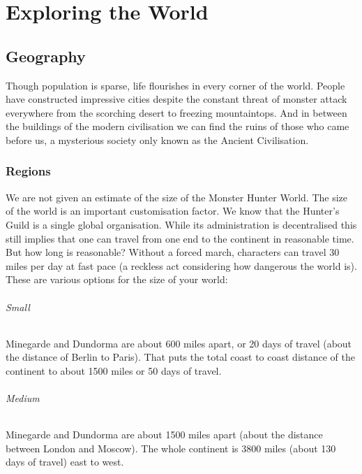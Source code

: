 
\renewcommand*{\hbPartCover}{assets/ext/world-cover}
\renewcommand*{\hbPartSubcover}{assets/ext/world-cover2}

\part{Exploring the World}

\chapter{Geography}


Though population is sparse, life flourishes in every corner of the world. People have constructed impressive cities despite the constant threat of monster attack everywhere from the scorching desert to freezing mountaintops. And in between the buildings of the modern civilisation we can find the ruins of those who came before us, a mysterious society only known as the Ancient Civilisation.

\section{Regions}
We are not given an estimate of the size of the Monster Hunter World. The size of the world is an important customisation factor. We know that the Hunter's Guild is a single global organisation. While its administration is decentralised this still implies that one can travel from one end to the continent in reasonable time. But how long is reasonable? Without a forced march, characters can travel 30 miles per day at fast pace (a reckless act considering how dangerous the world is). These are various options for the size of your world:

\paragraph{Small} Minegarde and Dundorma are about 600 miles apart, or 20 days of travel (about the distance of Berlin to Paris). That puts the total coast to coast distance of the continent to about 1500 miles or 50 days of travel.

\paragraph{Medium} Minegarde and Dundorma are about 1500 miles apart (about the distance between London and Moscow). The whole continent is 3800 miles (about 130 days of travel) east to west.


